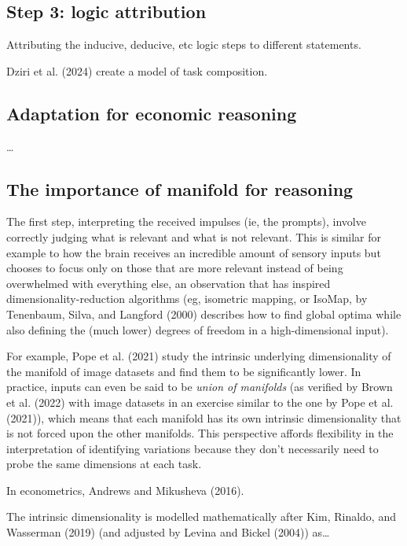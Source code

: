 \documentclass[
]{article}
\begin{document}
\subsection{Step 3: logic attribution}\label{step-3-logic-attribution}

Attributing the inducive, deducive, etc logic steps to different
statements.

Dziri et al. (2024) create a model of task composition.

\subsection{Adaptation for economic
reasoning}\label{adaptation-for-economic-reasoning}

\ldots{}

\subsection{The importance of manifold for
reasoning}\label{the-importance-of-manifold-for-reasoning}

The first step, interpreting the received impulses (ie, the prompts),
involve correctly judging what is relevant and what is not relevant.
This is similar for example to how the brain receives an incredible
amount of sensory inputs but chooses to focus only on those that are
more relevant instead of being overwhelmed with everything else, an
observation that has inspired dimensionality-reduction algorithms (eg,
isometric mapping, or IsoMap, by Tenenbaum, Silva, and Langford (2000)
describes how to find global optima while also defining the (much lower)
degrees of freedom in a high-dimensional input).

For example, Pope et al. (2021) study the intrinsic underlying
dimensionality of the manifold of image datasets and find them to be
significantly lower. In practice, inputs can even be said to be
\emph{union of manifolds} (as verified by Brown et al. (2022) with image
datasets in an exercise similar to the one by Pope et al. (2021)), which
means that each manifold has its own intrinsic dimensionality that is
not forced upon the other manifolds. This perspective affords
flexibility in the interpretation of identifying variations because they
don't necessarily need to probe the same dimensions at each task.

In econometrics, Andrews and Mikusheva (2016).

The intrinsic dimensionality is modelled mathematically after Kim,
Rinaldo, and Wasserman (2019) (and adjusted by Levina and Bickel (2004))
as\ldots{}
\end{document}
